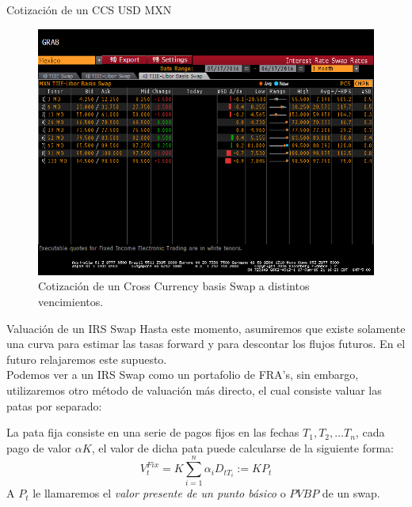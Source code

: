 \documentclass[11pt]{beamer}
\begin{document}
\begin{frame}{Cotización de un CCS USD MXN}
\begin{figure}
	\centering
	\includegraphics[width=0.8\linewidth]{CCSUSDMXN}
	\caption{Cotización de un Cross Currency basis Swap a distintos vencimientos.}
	\label{fig:ccsusdmxn}
\end{figure}

\end{frame}
\begin{frame}{Valuación de un IRS Swap}
	Hasta este momento, asumiremos que existe solamente una curva para estimar las tasas forward y para descontar los flujos futuros. En el futuro relajaremos este supuesto.\\
	
	Podemos ver a un IRS Swap como un portafolio de FRA's, sin embargo, utilizaremos otro método de valuación más directo, el cual consiste valuar las patas por separado:
	
	La pata fija consiste en una serie de pagos fijos en las fechas $T_1, T_2, \dots T_n$, cada pago de valor $\alpha K$, el valor de dicha pata puede calcularse de la siguiente forma:
	\begin{equation}
	V_t^{Fix}=K \sum_{i=1}^{n} \alpha _i D_{t T_i} := KP_t
	\end{equation}
	 A $P_t$ le llamaremos el \textit{valor presente de un punto básico} o $PVBP$ de un swap.

\end{frame}
\end{document}
